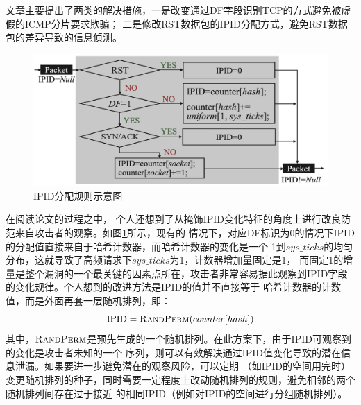 \documentclass[a4paper]{article}
\begin{document}
文章主要提出了两类的解决措施，一是改变通过DF字段识别TCP的方式避免被虚假的ICMP分片要求欺骗；
二是修改RST数据包的IPID分配方式，避免RST数据包的差异导致的信息侦测。
\begin{figure}[!htb]\centering
  \includegraphics[scale=0.2]{figures/original.png}
  \caption{IPID分配规则示意图}
  \label{fig:ipid}
\end{figure}

在阅读论文的过程之中，
个人还想到了从掩饰IPID变化特征的角度上进行改良防范来自攻击者的观察。如图\ref{fig:ipid}所示，现有的
情况下，对应DF标识为0的情况下IPID的分配值直接来自于哈希计数器，而哈希计数器的变化是一个
1到$sys\_ticks$的均匀分布，这就导致了高频请求下$sys\_ticks$为1，计数器增加量固定是1，
而固定1的增量是整个漏洞的一个最关键的因素点所在，攻击者非常容易据此观察到IPID字段的变化规律。个人想到的改进方法是IPID的值并不直接等于
哈希计数器的计数值，而是外面再套一层随机排列，即：
$$\text{IPID} = \textsc{RandPerm}(counter[hash])$$
其中，$\textsc{RandPerm}$是预先生成的一个随机排列。在此方案下，由于IPID可观察到的变化是攻击者未知的一个
序列，则可以有效解决通过IPID值变化导致的潜在信息泄漏。如果要进一步避免潜在的观察风险，可以定期
（如IPID的空间用完时）变更随机排列的种子，同时需要一定程度上改动随机排列的规则，避免相邻的两个随机排列间存在过于接近
的相同IPID（例如对IPID的空间进行分组随机排列）。

\vspace{200pt}
\end{document}
